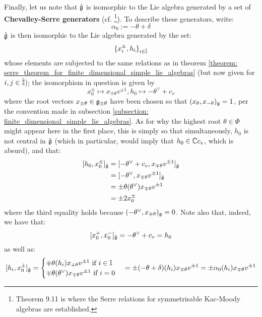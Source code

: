         Finally, let us note that $\hat{\mathfrak{g}}$ is isomorphic to the Lie algebra generated by a set of \textbf{Chevalley-Serre generators} (cf. \cite[Theorems 1.2, 1.4, and 9.11]{kac_infinite_dimensional_lie_algebras}\footnote{Theorem 9.11 is where the Serre relations for symmetrisable Kac-Moody algebras are established.}). To describe these generators, write:
            $$\alpha_0 := -\theta + \delta$$
        $\hat{\mathfrak{g}}$ is then isomorphic to the Lie algebra generated by the set:
            $$\{x_i^{\pm}, h_i\}_{i \in \hat{\mathbb{I}}}$$
        whose elements are subjected to the same relations as in theorem \ref{theorem: serre_theorem_for_finite_dimensional_simple_lie_algebras} (but now given for $i, j \in \hat{\mathbb{I}}$); the isomorphism in question is given by
            $$x_0^{\pm} \mapsto x_{\mp \theta} v^{\pm 1}, h_0 \mapsto -\theta^{\vee} + c_v$$
        where the root vectors $x_{\pm \theta} \in \mathfrak{g}_{\pm \theta}$ have been chosen so that $(x_{\theta}, x_{-\theta})_{\mathfrak{g}} = 1$, per the convention made in subsection \ref{subsection: finite_dimensional_simple_lie_algebras}. As for why the highest root $\theta \in \Phi$ might appear here in the first place, this is simply so that simultaneously, $h_0$ is not central in $\hat{\mathfrak{g}}$ (which in particular, would imply that $h_0 \in \mathbb{C} c_v$, which is absurd), and that:
            $$
                \begin{aligned}
                    [h_0, x_0^{\pm}]_{\hat{\g}} & = [-\theta^{\vee} + c_v, x_{\mp \theta} v^{\pm 1}]_{\hat{\g}}
                    \\
                    & = [-\theta^{\vee}, x_{\mp \theta} v^{\pm 1}]_{\hat{\g}}
                    \\
                    & = \pm \theta(\theta^{\vee}) x_{\mp \theta} v^{\pm 1}
                    \\
                    & = \pm 2 x_0^{\pm}
                \end{aligned}
            $$
        where the third equality holds because $(-\theta^{\vee}, x_{\mp \theta})_{\mathfrak{g}} = 0$. Note also that, indeed, we have that:
            $$[x_0^+, x_0^-]_{\hat{\mathfrak{g}}} = -\theta^{\vee} + c_v = h_0$$
        as well as:
            $$
                [h_i, x_0^{\pm}]_{\hat{\mathfrak{g}}}
                =
                \begin{cases}
                    \text{$\mp \theta(h_i) x_{\mp \theta} v^{\pm 1}$ if $i \in \mathbb{I}$}
                    \\
                    \text{$\mp \theta(\theta^{\vee}) x_{\mp \theta} v^{\pm 1}$ if $i = 0$}
                \end{cases}
                =
                \pm (-\theta + \delta)(h_i) x_{\mp \theta} v^{\pm 1} = \pm \alpha_0(h_i) x_{\mp \theta} v^{\pm 1}
            $$
